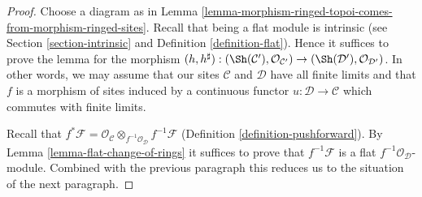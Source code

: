 \begin{proof}
Choose a diagram as in
Lemma \ref{lemma-morphism-ringed-topoi-comes-from-morphism-ringed-sites}.
Recall that being a flat module is intrinsic
(see Section \ref{section-intrinsic} and
Definition \ref{definition-flat}).
Hence it suffices to prove the lemma for
the morphism $(h, h^\sharp) :
(\Sh(\mathcal{C}'), \mathcal{O}_{\mathcal{C}'})
\to
(\Sh(\mathcal{D}'), \mathcal{O}_{\mathcal{D}'})$.
In other words, we may assume that
our sites $\mathcal{C}$ and $\mathcal{D}$
have all finite limits and that $f$ is a morphism
of sites induced by a continuous functor $u : \mathcal{D} \to \mathcal{C}$
which commutes with finite limits.

\medskip\noindent
Recall that $f^*\mathcal{F} =
\mathcal{O}_\mathcal{C} \otimes_{f^{-1}\mathcal{O}_\mathcal{D}}
f^{-1}\mathcal{F}$ (Definition \ref{definition-pushforward}).
By Lemma \ref{lemma-flat-change-of-rings} it suffices to
prove that $f^{-1}\mathcal{F}$ is a flat
$f^{-1}\mathcal{O}_\mathcal{D}$-module. Combined with
the previous paragraph this reduces us to the situation
of the next paragraph.


\end{proof}

